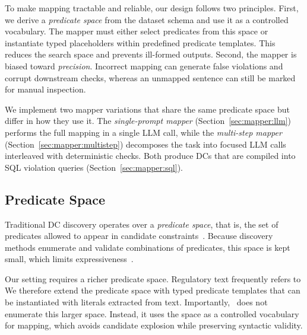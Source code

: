 To make mapping tractable and reliable, our design follows two principles. First, we derive a \emph{predicate space} from the dataset schema and use it as a controlled vocabulary. The mapper must either select predicates from this space or instantiate typed placeholders within predefined predicate templates. This reduces the search space and prevents ill-formed outputs. Second, the mapper is biased toward \emph{precision}. Incorrect mapping can generate false violations and corrupt downstream checks, whereas an unmapped sentence can still be marked for manual inspection.

We implement two mapper variations that share the same predicate space but differ in how they use it. The \emph{single-prompt mapper} (Section~\ref{sec:mapper:llm}) performs the full mapping in a single LLM call, while the \emph{multi-step mapper} (Section~\ref{sec:mapper:multistep}) decomposes the task into focused LLM calls interleaved with deterministic checks. Both produce DCs that are compiled into SQL violation queries (Section~\ref{sec:mapper:sql}).


\subsection{Predicate Space}
\label{sec:mapper:predicate-space}

Traditional DC discovery operates over a \emph{predicate space}, that is, the set of predicates allowed to appear in candidate constraints~\cite{chu2013discovering,Pena2019DiscoveryDC}. Because discovery methods enumerate and validate combinations of predicates, this space is kept small, which limits expressiveness~\cite{chu2013discovering}.

Our setting requires a richer predicate space. Regulatory text frequently refers to  We therefore extend the predicate space with typed predicate templates that can be instantiated with literals extracted from text. Importantly, \system\ does not enumerate  this larger space. Instead, it uses the space as a controlled vocabulary for mapping, which avoids candidate explosion while preserving syntactic validity.

